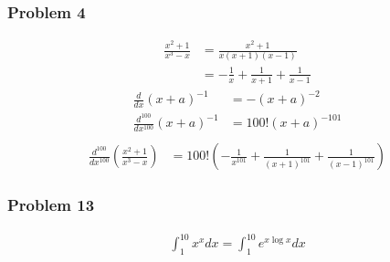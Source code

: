 \documentclass[10pt,a4paper]{article}
\theoremstyle{definition}
\begin{document}
\subsubsection{Problem 4}
\begin{align}
    \frac{x^2+1}{x^3-x}&=\frac{x^2+1}{x(x+1)(x-1)}\\
    &=-\frac{1}{x}+\frac{1}{x+1}+\frac{1}{x-1}
\end{align}
\begin{align}
    \frac{d}{dx}(x+a)^{-1}&=-(x+a)^{-2}\\
    \frac{d^{100}}{dx^{100}}(x+a)^{-1}&=100!(x+a)^{-101}\\
\end{align}
\begin{align}
    \frac{d^{100}}{dx^{100}}\left(\frac{x^2+1}{x^3-x}\right)&=100!\left(-\frac{1}{x^{101}}+\frac{1}{(x+1)^{101}}+\frac{1}{(x-1)^{101}}\right)
\end{align}

\subsubsection{Problem 13}
\begin{align}
    \int_1^{10} x^x dx=\int_1^{10} e^{x\log x} dx
\end{align}
\end{document}
